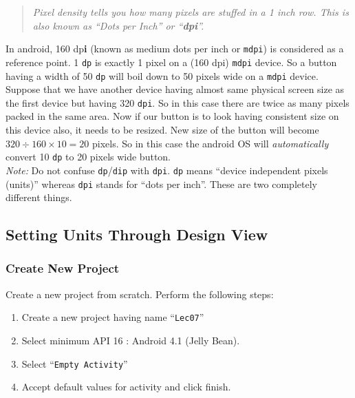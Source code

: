 \begin{quote}
	\textit{Pixel density tells you how many pixels are stuffed in a 1 inch row. This is also known as ``Dots per Inch'' or ``\textbf{dpi}''.}
\end{quote}

In android, 160 dp\textbf{i} (known as medium dots per inch or \texttt{mdpi}) is considered as a reference point. 1 \texttt{dp} is exactly 1 pixel on a (160 dpi) \texttt{mdpi} device. So a button having a width of 50 \texttt{dp} will boil down to 50 pixels wide on a \texttt{mdpi} device. 
Suppose that we have another device having almost same physical screen size as the first device but having 320 \texttt{dpi}. So in this case there are twice as many pixels packed in the same area. Now if our button is to look having consistent size on this device also, it needs to be resized. New size of the button will become $320\div160\times10 = 20$ pixels. So in this case the android OS will \textit{automatically} convert 10 \texttt{dp} to 20 pixels wide button. \\

\textit{Note:} Do not confuse \texttt{dp}/\texttt{dip} with \texttt{dpi}. \texttt{dp} means ``device independent pixels (units)'' whereas \texttt{dpi} stands for ``dots per inch''. These are two completely different things.\\

\subsection{Setting Units Through Design View}
\subsubsection{Create New Project}
\label{ITS:createProj}
Create a new project from scratch. Perform the following steps:
\begin{enumerate}
	\item Create a new project having name ``\texttt{Lec07}''
	\item Select minimum API 16 : Android 4.1 (Jelly Bean).
	\item Select ``\texttt{Empty Activity}''
	\item Accept default values for activity and click finish. \\
\end{enumerate}

